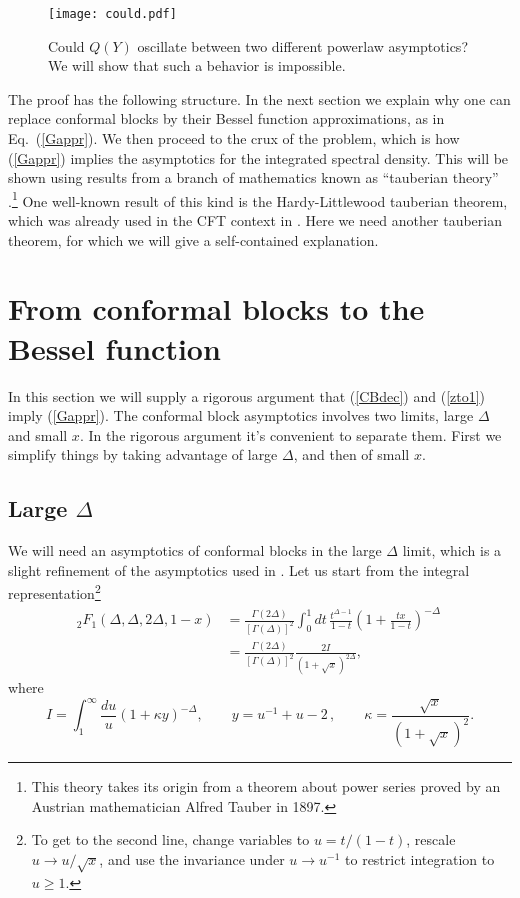 \documentclass[12pt]{article}
\newcommand{\reef}[1]{(\ref{#1})}
\newcommand{\beq}{\begin{equation}}
\newcommand{\eeq}{\end{equation}}
\def\nn{\nonumber}
\def\ge{\geqslant}
\def\nn{\nonumber}
\newcommand{\D}{\Delta}
\numberwithin{equation}{section}
\begin{document}
\begin{figure}
\centering
\texttt{[image: could.pdf]}
\caption{Could $Q(Y)$ oscillate between two different powerlaw asymptotics? We will show that such a behavior is impossible.}
\label{could}
\end{figure}

The proof has the following structure. In the next section we explain why one can replace conformal blocks by their Bessel function approximations, as in Eq.~\reef{Gappr}. We then proceed to the crux of the problem, which is how \reef{Gappr} implies the asymptotics for the integrated spectral density. This will be shown using results from a branch of mathematics known as ``tauberian theory'' \cite{Korevaar}.\footnote{This theory takes its origin from a theorem about power series proved by an Austrian mathematician Alfred Tauber in 1897.} One well-known result of this kind is the Hardy-Littlewood tauberian theorem, which was already used in the CFT context in \cite{Pappadopulo:2012jk}. Here we need another tauberian theorem, for which we will give a self-contained explanation.

\section{From conformal blocks to the Bessel function}
\label{secBessel}

In this section we will supply a rigorous argument that \reef{CBdec} and \reef{zto1} imply \reef{Gappr}. 
The conformal block asymptotics involves two limits, large $\D$ and small $x$. In the rigorous argument it's convenient to separate them. First we simplify things by taking advantage of large $\D$, and then of small $x$.

\subsection{Large $\D$}
\label{sec:largeD}

We will need an asymptotics of conformal blocks in the large $\Delta$ limit, which is a slight refinement of the asymptotics used in \cite{Fitzpatrick:2012yx,Komargodski:2012ek}. Let us start from the integral 
representation\footnote{To get to the second line, change variables to $u=t/(1-t)$, rescale $u\to u/\sqrt{x}$, and use the invariance under $u\to u^{-1}$ to restrict integration to $u\ge 1$.}
\begin{align}
{}_2F_{1}(\D,\D,2\D,1-x)&= 
\frac{\Gamma(2\Delta)}{[\Gamma(\D)]^2} \int_0^1 dt\,\frac{t^{\D-1}}{1-t}
\left(1+ \frac{tx}{1-t}\right)^{-\D}\,\nn\\
&=\frac{\Gamma(2\Delta)}{[\Gamma(\D)]^2} \frac{2 I}{(1+\sqrt{x})^{2\D}},
\end{align}
where  
\beq
\label{I}
I = \int_1^\infty \frac{du}{u}(1+\kappa y)^{-\D},\qquad y=u^{-1}+u-2\,,\qquad
\kappa=\frac{\sqrt{x}}{(1+\sqrt{x})^2}.
\eeq
\end{document}
